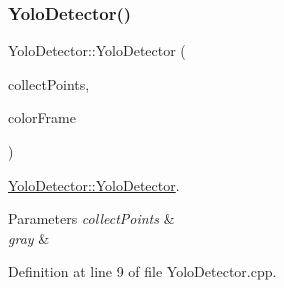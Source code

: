 \subsubsection{\texorpdfstring{Yolo\+Detector()}{YoloDetector()}}
{\footnotesize\ttfamily Yolo\+Detector\+::\+Yolo\+Detector (\begin{DoxyParamCaption}\item[{bool}]{collect\+Points,  }\item[{cv\+::\+U\+Mat \&}]{color\+Frame }\end{DoxyParamCaption})}



\mbox{\hyperlink{class_yolo_detector_a60f435b2aa412d583038300d086255de}{Yolo\+Detector\+::\+Yolo\+Detector}}. 


\begin{DoxyParams}{Parameters}
{\em collect\+Points} & \\
\hline
{\em gray} & \\
\hline
\end{DoxyParams}


Definition at line 9 of file Yolo\+Detector.\+cpp.


